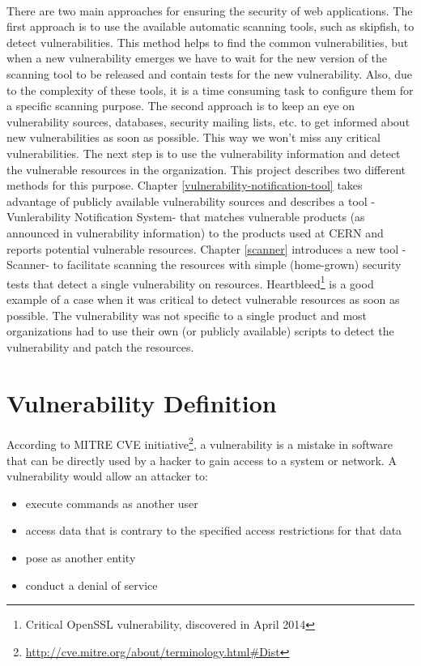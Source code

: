 \paragraph{}
There are two main approaches for ensuring the security of web applications. The first approach is to use the available automatic scanning tools, such as skipfish, to detect vulnerabilities. This method helps to find the common vulnerabilities, but when a new vulnerability emerges we have to wait for the new version of the scanning tool to be released and contain tests for the new vulnerability. Also, due to the complexity of these tools, it is a time consuming task to configure them for a specific scanning purpose. 
The second approach is to keep an eye on vulnerability sources, databases, security mailing lists, etc. to get informed about new vulnerabilities as soon as possible. This way we won't miss any critical vulnerabilities. The next step is to use the vulnerability information and detect the vulnerable resources in the organization. This project describes two different methods for this purpose. Chapter \ref{vulnerability-notification-tool} takes advantage of publicly available vulnerability sources and describes a tool -Vunlerability Notification System- that matches  vulnerable products (as announced in vulnerability information) to the products used at CERN and reports potential vulnerable resources. Chapter \ref{scanner} introduces a new tool -Scanner- to facilitate scanning the resources with simple (home-grown) security tests that detect a single vulnerability on resources. Heartbleed\footnote{Critical OpenSSL vulnerability, discovered in April 2014} is a good example of a case when it was critical to detect vulnerable resources as soon as possible. The vulnerability was not specific to a single product and most organizations had to use their own (or publicly available) scripts to detect the vulnerability and patch the resources.

\section{Vulnerability Definition}
According to MITRE CVE initiative\footnote{\url{http://cve.mitre.org/about/terminology.html\#Dist}}, a vulnerability is a mistake in software that can be directly used by a hacker to gain access to a system or network. A vulnerability would allow an attacker to:
\begin{itemize}
\item execute commands as another user
\item access data that is contrary to the specified access restrictions for that data
\item pose as another entity
\item conduct a denial of service
\end{itemize}

